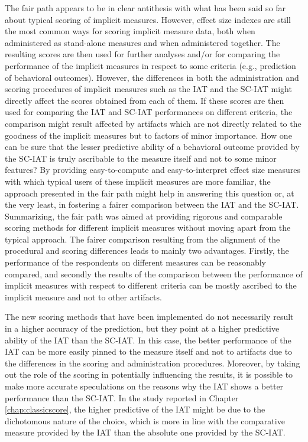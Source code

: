\documentclass[12pt]{book}
\begin{document}
The fair path appears to be in clear antithesis with what has been said so far about typical scoring of implicit measures.
However, effect size indexes are still the most common ways for scoring implicit measure data, both when administered as stand-alone measures and when  administered together. 
The resulting scores are then used for further analyses and/or for comparing the performance of the implicit measures in respect to some criteria (e.g., prediction of behavioral outcomes).
	However, the differences in both the administration and scoring procedures of implicit measures such as the IAT and the SC-IAT might directly affect the scores obtained from each of them. 
	If these scores are then used for comparing the IAT and SC-IAT performances on different criteria, the comparison might result affected by artifacts which are not directly related to the goodness of the implicit measures but to factors of minor importance. 
	How one can be sure that the lesser predictive ability  of a behavioral outcome provided by the SC-IAT is truly ascribable to the measure itself and not to some minor features? 
	By providing easy-to-compute and easy-to-interpret effect size measures with which typical users of these implicit measures are more familiar, the approach presented in the fair path might help in answering this question or, at the very least, in fostering a fairer comparison between the IAT and the SC-IAT. Summarizing, the fair path was aimed at providing rigorous and comparable scoring methods for different implicit measures without moving apart from the typical approach.  
The fairer comparison resulting from the alignment of the procedural and scoring differences leads to mainly two advantages. Firstly, the performance of the respondents on different measures can be reasonably compared, and secondly the results of the comparison between the performance of implicit measures with respect to different criteria can be mostly ascribed to the implicit measure and not to other artifacts. 

The new scoring methods that have been implemented do not necessarily result in a higher accuracy of the prediction, but they point at a higher predictive ability of the IAT than the SC-IAT. In this case, the better performance of the IAT can be more easily pinned to the measure itself and not to artifacts due to the differences in the scoring and administration procedures. Moreover, by taking out the role of the scoring in potentially influencing the results, it is possible to make more accurate speculations on the reasons why the IAT shows a better performance than the SC-IAT.  
In the study reported in Chapter \ref{chap:classicscore}, the higher predictive of the IAT might be due to the dichotomous nature of the choice, which is more in line with the comparative measure provided by the IAT than the absolute one provided by the SC-IAT.
\end{document}
